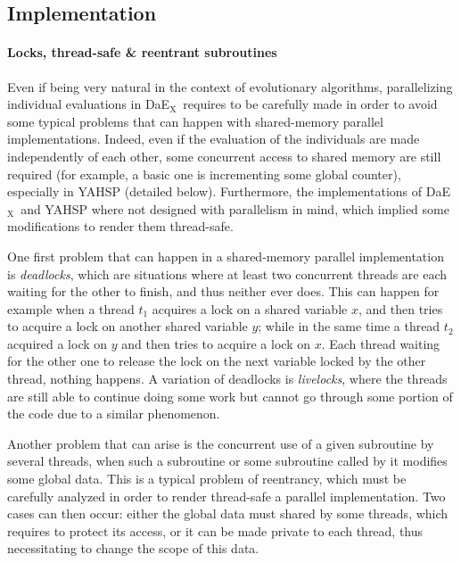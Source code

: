 \documentclass{sig-alternate}
\newcommand{\DAEX}{{\sc DaE$_{\text{X}}$}}
\begin{document}
\subsection{Implementation}

\paragraph{Locks, thread-safe \& reentrant subroutines} %

Even  if  being  very  natural   in  the  context  of  evolutionary  algorithms,
parallelizing individual evaluations in \DAEX\  requires to be carefully made in
order to avoid some typical problems that can happen with shared-memory parallel
implementations.  Indeed,  even if  the evaluation of  the individuals  are made
independently of each  other, some concurrent access to  shared memory are still
required  (for  example, a  basic  one  is  incrementing some  global  counter),
especially in YAHSP (detailed below). Furthermore, the implementations of \DAEX\
and  YAHSP where  not  designed with  parallelism  in mind,  which implied  some
modifications to render them thread-safe.

One first problem that can  happen in a shared-memory parallel implementation is
\emph{deadlocks}, which are situations where at least two concurrent threads are
each waiting  for the  other to finish,  and thus  neither ever does.   This can
happen for example when a thread $t_1$ acquires a lock on a shared variable $x$,
and then tries  to acquire a lock  on another shared variable $y$;  while in the
same time a thread $t_2$ acquired a lock on $y$ and then tries to acquire a lock
on $x$.  Each thread  waiting for the other one to release  the lock on the next
variable locked by the other  thread, nothing happens.  A variation of deadlocks
is \emph{livelocks},  where the  threads are still  able to continue  doing some
work but cannot go through some portion of the code due to a similar phenomenon.

Another problem  that can arise is the  concurrent use of a  given subroutine by
several threads, when such a subroutine or some subroutine called by it modifies
some  global data.   This is  a  typical problem  of reentrancy,  which must  be
carefully analyzed in order to render thread-safe a parallel implementation. Two
cases can then occur: either the  global data must shared by some threads, which
requires to protect its  access, or it can be made private  to each thread, thus
necessitating to change the scope of this data.
\end{document}
